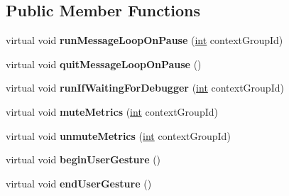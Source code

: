 \subsection*{Public Member Functions}
\begin{DoxyCompactItemize}
\item 
\mbox{\label{classv8__inspector_1_1V8InspectorClient_addb36888a924efd510be43f9af456948}} 
virtual void {\bfseries run\+Message\+Loop\+On\+Pause} (\mbox{\hyperlink{classint}{int}} context\+Group\+Id)
\item 
\mbox{\label{classv8__inspector_1_1V8InspectorClient_aeb0a389933779eb818e10047ceb584f8}} 
virtual void {\bfseries quit\+Message\+Loop\+On\+Pause} ()
\item 
\mbox{\label{classv8__inspector_1_1V8InspectorClient_a421ba78d7e2f2f1d4cc214d83f0fd87a}} 
virtual void {\bfseries run\+If\+Waiting\+For\+Debugger} (\mbox{\hyperlink{classint}{int}} context\+Group\+Id)
\item 
\mbox{\label{classv8__inspector_1_1V8InspectorClient_a3b97058f1dcc3ecfe299025d8acd0c93}} 
virtual void {\bfseries mute\+Metrics} (\mbox{\hyperlink{classint}{int}} context\+Group\+Id)
\item 
\mbox{\label{classv8__inspector_1_1V8InspectorClient_a283517b17f71fbeb75e0c19dde9f8189}} 
virtual void {\bfseries unmute\+Metrics} (\mbox{\hyperlink{classint}{int}} context\+Group\+Id)
\item 
\mbox{\label{classv8__inspector_1_1V8InspectorClient_a9ca8135c960cb9c769cf9ab85bd8cbd8}} 
virtual void {\bfseries begin\+User\+Gesture} ()
\item 
\mbox{\label{classv8__inspector_1_1V8InspectorClient_a0de728d61603c38b38062fa9eddde23e}} 
virtual void {\bfseries end\+User\+Gesture} ()
\item 
\mbox{\label{classv8__inspector_1_1V8InspectorClient_a723010fe1993d44c313480ced3a43208}} 

\end{DoxyCompactItemize}
